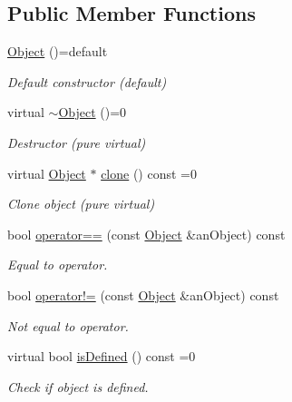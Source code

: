 \subsection*{Public Member Functions}
\begin{DoxyCompactItemize}
\item 
\hyperlink{classlibrary_1_1math_1_1geom_1_1d3_1_1_object_ab484354bbce44290b6d288c7825d9e42}{Object} ()=default
\begin{DoxyCompactList}\small\item\em Default constructor (default) \end{DoxyCompactList}\item 
virtual \hyperlink{classlibrary_1_1math_1_1geom_1_1d3_1_1_object_addfda217130395f6eeb080a2fe406876}{$\sim$\+Object} ()=0
\begin{DoxyCompactList}\small\item\em Destructor (pure virtual) \end{DoxyCompactList}\item 
virtual \hyperlink{classlibrary_1_1math_1_1geom_1_1d3_1_1_object}{Object} $\ast$ \hyperlink{classlibrary_1_1math_1_1geom_1_1d3_1_1_object_a1a784c6b359e0eb97cd34fabc42f2f3f}{clone} () const =0
\begin{DoxyCompactList}\small\item\em Clone object (pure virtual) \end{DoxyCompactList}\item 
bool \hyperlink{classlibrary_1_1math_1_1geom_1_1d3_1_1_object_a7a68a18bae9709a8cbba5036fd5ad3a0}{operator==} (const \hyperlink{classlibrary_1_1math_1_1geom_1_1d3_1_1_object}{Object} \&an\+Object) const
\begin{DoxyCompactList}\small\item\em Equal to operator. \end{DoxyCompactList}\item 
bool \hyperlink{classlibrary_1_1math_1_1geom_1_1d3_1_1_object_aebd8708ac1608c0b64ce73b415d5256b}{operator!=} (const \hyperlink{classlibrary_1_1math_1_1geom_1_1d3_1_1_object}{Object} \&an\+Object) const
\begin{DoxyCompactList}\small\item\em Not equal to operator. \end{DoxyCompactList}\item 
virtual bool \hyperlink{classlibrary_1_1math_1_1geom_1_1d3_1_1_object_a2216442e322f0c3ca5f01a4efa22baf7}{is\+Defined} () const =0
\begin{DoxyCompactList}\small\item\em Check if object is defined. \end{DoxyCompactList}\item 

\end{DoxyCompactItemize}
